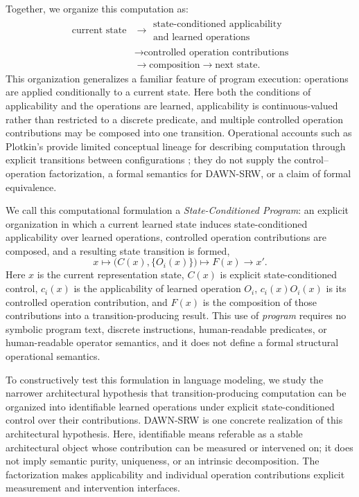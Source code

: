 \documentclass{article}
\newcommand{\DAWN}{DAWN-SRW}
\begin{document}
Together, we organize this computation as:
\[
\begin{aligned}
\text{current state}
&\longrightarrow
\substack{\text{state-conditioned applicability}\\[-0.15em]
\text{and learned operations}}\\[-0.1em]
&\longrightarrow
\text{controlled operation contributions}\\[-0.1em]
&\longrightarrow
\text{composition}
\longrightarrow
\text{next state}.
\end{aligned}
\]
This organization generalizes a familiar feature of program execution:
operations are applied conditionally to a current state. Here both the
conditions of applicability and the operations are learned, applicability is
continuous-valued rather than restricted to a discrete predicate, and multiple
controlled operation contributions may be composed into one transition.
Operational accounts such as Plotkin's provide limited conceptual lineage for
describing computation through explicit transitions between configurations
\cite{plotkin1981structural}; they do not supply the control--operation
factorization, a formal semantics for \DAWN{}, or a claim of formal equivalence.

We call this computational formulation a \emph{State-Conditioned
Program}: an explicit organization in which a current learned state induces
state-conditioned applicability over learned operations, controlled operation
contributions are composed, and a resulting state transition is formed,
\[
x\longmapsto\big(C(x),\{O_i(x)\}\big)\longmapsto F(x)\longrightarrow x'.
\]
Here \(x\) is the current representation state, \(C(x)\) is explicit
state-conditioned control, \(c_i(x)\) is the applicability of learned operation
\(O_i\), \(c_i(x)O_i(x)\) is its controlled operation contribution, and \(F(x)\)
is the composition of those contributions into a transition-producing result.
This use of \emph{program} requires no symbolic program text, discrete
instructions, human-readable predicates, or human-readable operator semantics,
and it does not define a formal structural operational semantics.

To constructively test this formulation in language modeling, we study the
narrower architectural hypothesis that transition-producing computation can be
organized into identifiable learned operations under explicit state-conditioned
control over their contributions. \DAWN{} is one concrete realization of this
architectural hypothesis. Here, identifiable means referable as a stable
architectural object whose contribution can be measured or intervened on; it
does not imply semantic purity, uniqueness, or an intrinsic decomposition. The
factorization makes applicability and individual operation contributions
explicit measurement and intervention interfaces.
\end{document}
